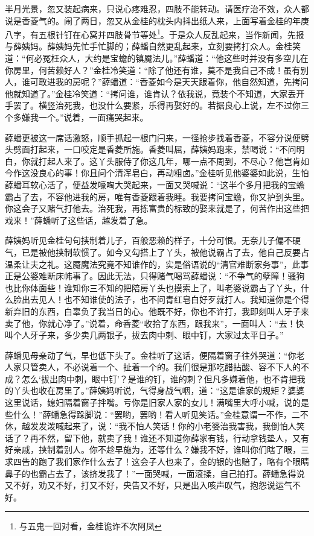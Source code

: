 \documentclass[12pt,oneside]{book}
\begin{document}
半月光景，忽又装起病来，只说心疼难忍，四肢不能转动。请医疗治不效，众人都说是香菱气的。闹了两日，忽又从金桂的枕头内抖出纸人来，上面写着金桂的年庚八字，有五根针钉在心窝并四肢骨节等处\footnote{与五鬼一回对看，金桂诡诈不次阿凤}。于是众人反乱起来，当作新闻，先报与薛姨妈。薛姨妈先忙手忙脚的；薛蟠自然更乱起来，立刻要拷打众人。金桂笑道：“何必冤枉众人，大约是宝蟾的镇魇法儿。”薛蟠道：“他这些时并没有多空儿在你房里，何苦赖好人？”金桂冷笑道：“除了他还有谁，莫不是我自己不成！虽有别人，谁可敢进我的房呢？”薛蟠道：“香菱如今是天天跟着你，他自然知道，先拷问他就知道了。”金桂冷笑道：“拷问谁，谁肯认？依我说，竟装个不知道，大家丢开手罢了。横竖治死我，也没什么要紧，乐得再娶好的。若据良心上说，左不过你三个多嫌我一个。”说着，一面痛哭起来。

薛蟠更被这一席话激怒，顺手抓起一根门闩来，一径抢步找着香菱，不容分说便劈头劈面打起来，一口咬定是香菱所施。香菱叫屈，薛姨妈跑来，禁喝说：“不问明白，你就打起人来了。这丫头服侍了你这几年，哪一点不周到，不尽心？他岂肯如今作这没良心的事！你且问个清浑皂白，再动粗卤。”金桂听见他婆婆如此说，生怕薛蟠耳软心活了，便益发嚎啕大哭起来，一面又哭喊说：“这半个多月把我的宝蟾霸占了去，不容他进我的房，唯有香菱跟着我睡。我要拷问宝蟾，你又护到头里。你这会子又赌气打他去。治死我，再拣富贵的标致的娶来就是了，何苦作出这些把戏来！”薛蟠听了这些话，越发着了急。

薛姨妈听见金桂句句挟制着儿子，百般恶赖的样子，十分可恨。无奈儿子偏不硬气，已是被他挟制软惯了。如今又勾搭上了丫头，被他说霸占了去，他自己反要占温柔让夫之礼。这魇魔法究竟不知谁作的，实是俗语说的“清官难断家务事”，此事正是公婆难断床帏事了。因此无法，只得赌气喝骂薛蟠说：“不争气的孽障！骚狗也比你体面些！谁知你三不知的把陪房丫头也摸索上了，叫老婆说霸占了丫头，什么脸出去见人！也不知谁使的法子，也不问青红皂白好歹就打人。我知道你是个得新弃旧的东西，白辜负了我当日的心。他既不好，你也不许打，我即刻叫人牙子来卖了他，你就心净了。”说着，命香菱“收拾了东西，跟我来”，一面叫人：“去！快叫个人牙子来，多少卖几两银子，拔去肉中刺、眼中钉，大家过太平日子。”

薛蟠见母亲动了气，早也低下头了。金桂听了这话，便隔着窗子往外哭道：“你老人家只管卖人，不必说着一个、扯着一个的。我们很是那吃醋拈酸、容不下人的不成？怎么‘拔出肉中刺，眼中钉’？是谁的钉，谁的刺？但凡多嫌着他，也不肯把我的丫头也收在房里了。”薛姨妈听说，气得身战气咽，道：“这是谁家的规矩？婆婆这里说话，媳妇隔着窗子拌嘴。亏你是旧家人家的女儿！满嘴里大呼小喊，说的是些什么！”薛蟠急得跺脚说：“罢哟，罢哟！看人听见笑话。”金桂意谓一不作，二不休，越发发泼喊起来了，说：“我不怕人笑话！你的小老婆治我害我，我倒怕人笑话了？再不然，留下他，就卖了我！谁还不知道你薛家有钱，行动拿钱垫人，又有好亲戚，挟制着别人。你不趁早施为，还等什么？嫌我不好，谁叫你们瞎了眼，三求四告的跑了我们家作什么去了！这会子人也来了，金的银的也赔了，略有个眼睛鼻子的也霸占去了，该挤发我了！”一面哭喊，一面滚揉，自己拍打。薛蟠急得说又不好，劝又不好，打又不好，央告又不好，只是出入咳声叹气，抱怨说运气不好。
\end{document}
